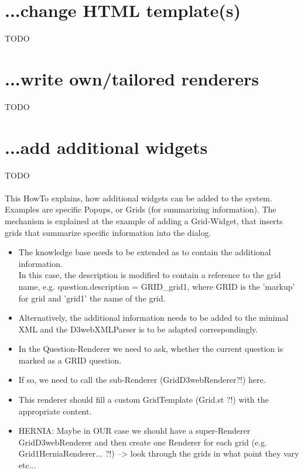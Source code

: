 \documentclass[a4paper,10pt]{scrreprt}
\begin{document}
\section{...change HTML template(s)}\label{howtostringtemplate}
TODO


\section{...write own/tailored renderers}\label{howtorenderer}
TODO


\section{...add additional widgets}
TODO\\\\
This HowTo explains, how additional widgets can be added to the system. 
Examples are specific Popups, or Grids (for summarizing information). 
The mechanism is explained at the example of adding a Grid-Widget, that inserts grids that summarize specific information into the dialog.
\begin{itemize}
	\item The knowledge base needs to be extended as to contain the additional information.\\
	In this case, the description is modified to contain a reference to the grid name, e.g.
	question.description = GRID\_grid1, where GRID is the 'markup' for grid and 'grid1' the name of the grid.
	\item Alternatively, the additional information needs to be added to the minimal XML and the D3webXMLParser is to be adapted correspondingly.
	\item In the Question-Renderer we need to ask, whether the current question is marked as a GRID question.
	\item If so, we need to call the sub-Renderer (GridD3webRenderer?!) here.
	\item This renderer should fill a custom GridTemplate (Grid.st ?!) with the appropriate content.
	\item HERNIA: Maybe in OUR case we should have a super-Renderer GridD3webRenderer and then create one Renderer for each grid (e.g. Grid1HerniaRenderer... ?!) --> look through the grids in what point they vary etc...
\end{itemize}
\end{document}
